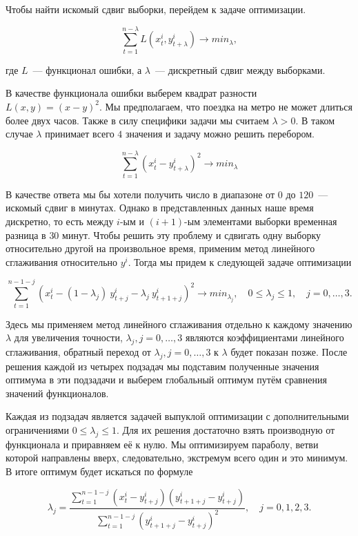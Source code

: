 \documentclass[12pt, fleqn, titlepage]{article}
\begin{document}
    Чтобы найти искомый сдвиг выборки, перейдем к задаче оптимизации.

    $$
    \sum_{t=1}^{n - \lambda}L(x^i_t, y^i_{t + \lambda}) \rightarrow min_{\lambda}, 
    $$

    где $L$~--- функционал ошибки, а $\lambda$~--- дискретный сдвиг между выборками.

    В качестве функционала ошибки выберем квадрат разности $L(x, y) = (x - y)^2$. 
    Мы предполагаем, что поездка на метро не может длиться более двух часов. 
    Также в силу специфики задачи мы считаем $\lambda > 0$. В таком случае $\lambda$ принимает всего 
    $4$ значения и задачу можно решить перебором.

    $$
    \sum_{t=1}^{n - \lambda}(x^i_t - y^i_{t + \lambda})^2 \rightarrow min_{\lambda}
    $$

    В качестве ответа мы бы хотели получить число в диапазоне от $0$ до $120$~--- искомый сдвиг в
    минутах. Однако в представленных данных наше время дискретно, 
    то есть между $i$-ым и $(i+1)$-ым элементами выборки временная разница в $30$ минут. 
    Чтобы решить эту проблему и сдвигать одну выборку относительно другой на произвольное время, 
    применим метод линейного сглаживания относительно $y^i$. Тогда мы придем к следующей задаче оптимизации

    $$
        \sum_{t = 1}^{n - 1 - j}(x^i_t - (1 - \lambda_j) \ y^i_{t + j} - \lambda_j \ y^i_{t + 1 + j})^2 
        \rightarrow min_{\lambda_j} , \quad 0 \le \lambda_j \le 1, \quad j = 0, \dots, 3.
    $$

    Здесь мы применяем метод линейного сглаживания отдельно к каждому значению $\lambda$  
    для увеличения точности, $\lambda_j, j = 0, \dots, 3$ являются коэффициентами линейного сглаживания, 
    обратный переход от $\lambda_j, j = 0, \dots, 3$ к $\lambda$ будет показан позже. 
    После решения каждой из четырех подзадач мы подставим полученные 
    значения оптимума в эти подзадачи и выберем глобальный оптимум путём сравнения значений функционалов.
    
    Каждая из подзадач является задачей выпуклой оптимизации с дополнительными ограничениями  
    $0 \le \lambda_j \le 1$. Для их решения достаточно взять производную от функционала и приравняем её к нулю. 
    Мы оптимизируем параболу, ветви которой направлены вверх, следовательно, экстремум всего один и это минимум. 
    В итоге оптимум будет искаться по формуле

    $$
    \lambda_j = \frac{\sum_{t=1}^{n-1-j}(x^i_t - y^i_{t+j})(y^i_{t+1+j} - y^i_{t+j})}{\sum_{t=1}^{n-1-j}(y^i_{t+1+j} - y^i_{t+j})^2}, \quad j = 0, 1, 2, 3.
    $$
\end{document}
